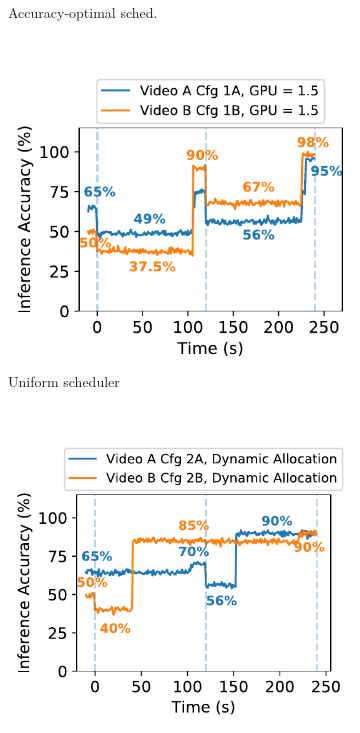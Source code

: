 \begin{figure}[t]
\begin{subfigure}[t]{0.47\columnwidth}
    \caption{\small Accuracy-optimal sched.}
    \label{fig:schedmot-res-prioritization}
  \end{subfigure}
      ~~\\
  \begin{subfigure}[t]{0.47\columnwidth}
    \centering
    \includegraphics[width=\linewidth]{ekya/figures/motivation/Scheduler/schedmot_multiwindow_eventual_best_cfgs.pdf}
    \caption{\small Uniform scheduler}
    \label{fig:schedmot-naive}
  \end{subfigure}  
  ~~
  \begin{subfigure}[t]{0.47\columnwidth}
    \centering
    \includegraphics[width=\linewidth]{ekya/figures/motivation/Scheduler/schedmot_multiwindow_prioritization_and_optimal_cfgs.pdf}

\end{subfigure}
\end{figure}
